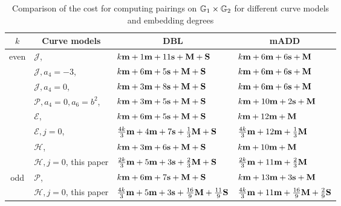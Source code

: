 \begin{table}[h]
\centering
\caption{Comparison of the cost for computing pairings on $\mathbb{G}_{1} \times \mathbb{G}_{2}$ for different curve models and embedding degrees}

\begin{tabular}{ l | l | l | l}
\hline
\multicolumn{1}{c|}{$k$}
&\multicolumn{1}{c|}{Curve models}	&\multicolumn{1}{c|}{DBL}	&\multicolumn{1}{c}{mADD}	\\
\hline
\multicolumn{1}{c|}{\multirow{6}{*}{even}}
&$\mathcal{J}$, \cite{2008/IonicaJoux08} \cite{2009/fastertate}
				&$k\textbf{m} + 1\textbf{m} + 11\textbf{s} + \textbf{M} + \textbf{S}$	&$k\textbf{m} + 6\textbf{m} + 6\textbf{s} + \textbf{M} $	\\
&$\mathcal{J},a_4 = -3$, \cite{2009/fastertate}
				&$k\textbf{m} + 6\textbf{m} + 5\textbf{s} + \textbf{M} + \textbf{S}$		&$k\textbf{m} + 6\textbf{m} + 6\textbf{s} + \textbf{M}$	\\
&$\mathcal{J},a_4 = 0$, \cite{2009/fastertate}		
				&$k\textbf{m} + 3\textbf{m} + 8\textbf{s} + \textbf{M} + \textbf{S}$		&$k\textbf{m} + 6\textbf{m} + 6\textbf{s} + \textbf{M}$	\\
&$\mathcal{P},a_4 = 0, a_6 = b^2$, \cite{2009/craig}
				&$k\textbf{m} + 3\textbf{m} + 5\textbf{s} + \textbf{M} + \textbf{S}$		&$k\textbf{m} + 10\textbf{m} + 2\textbf{s} + \textbf{M}$	\\
&$\mathcal{E}$, \cite{2009/fastertate}			
				&$k\textbf{m} + 6\textbf{m} + 5\textbf{s} + \textbf{M} + \textbf{S}$		&$k\textbf{m} + 12\textbf{m} + \textbf{M}$	\\
&$\mathcal{E},j=0$, \cite{2012/LWZ}
				&$\frac{4k}{3}\textbf{m} + 4\textbf{m} + 7\textbf{s}  + \frac{1}{3}\textbf{M} + \textbf{S}$
				&$\frac{4k}{3}\textbf{m} + 12\textbf{m}  + \frac{1}{3}\textbf{M}$ \\
&$\mathcal{H}$, \cite{2010/Gu}	&$k\textbf{m} + 3\textbf{m} + 6\textbf{s} + \textbf{M} + \textbf{S}$ &$k\textbf{m} + 10\textbf{m} + \textbf{M}$	\\
&$\mathcal{H},j=0$, this paper 	&
$ \frac{2k}{3}\textbf{m} + 5\textbf{m} + 3\textbf{s} + \frac{2}{3}\textbf{M} + \textbf{S}$		&
$ \frac{2k}{3}\textbf{m} + 11\textbf{m} + \frac{2}{3}\textbf{M}$	\\
\hline
\multicolumn{1}{c|}{\multirow{2}{*}{odd}}
&$\mathcal{P}$, \cite{2010/CLN}	&$k\textbf{m} + 6\textbf{m} + 7\textbf{s} + \textbf{M} + \textbf{S}$		&$k\textbf{m} + 13\textbf{m} + 3\textbf{s} + \textbf{M}$	\\
&$\mathcal{H},j=0$, this paper
&$ \frac{4k}{3}\textbf{m} + 5\textbf{m} + 3\textbf{s} + \frac{16}{9}\textbf{M} + \frac{11}{9}\textbf{S}$
&$\frac{4k}{3}\textbf{m} + 11\textbf{m} + \frac{16}{9}\textbf{M} + \frac{2}{9}\textbf{S} $	\\
\hline
\end{tabular}
\label{tbl-cmp}


\end{table}

